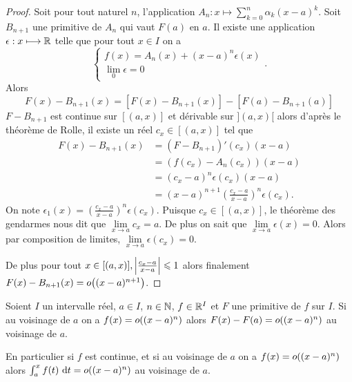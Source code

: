 \begin{proof}
  Soit pour tout naturel \(n\), l'application \(A_n : x \longmapsto \sum_{k = 0}^n
  \alpha_k(x-a)^k\). Soit \(B_{n+1}\) une primitive de \(A_n\) qui vaut \(F(a)\)
  en \(a\). Il existe une application \(\epsilon: x \longmapsto \mathbb{R}\) telle que
  pour tout \(x \in I\) on a
  \begin{equation}
    \begin{cases}
      f(x) = A_n(x)+(x-a)^n\epsilon(x) \\
      \lim\limits_{0} \epsilon = 0
    \end{cases}.
  \end{equation}
  Alors
  \begin{equation}
    F(x) - B_{n+1}(x) = [F(x)-B_{n+1}(x)] - [F(a)-B_{n+1}(a)]
  \end{equation}
  \(F-B_{n+1}\) est continue sur \([(a,x)]\) et dérivable sur \(](a,x)[\) alors
  d'après le théorème de Rolle, il existe un réel \(c_x \in [(a,x)]\) tel que
  \begin{align*}
    F(x)-B_{n+1}(x) &= (F-B_{n+1})'(c_x)(x-a)\\
    & = (f(c_x)-A_n(c_x))(x-a)\\
    & = (c_x-a)^n\epsilon(c_x)(x-a)\\
    & = (x-a)^{n+1} \left(\frac{c_x-a}{x-a}\right)^n \epsilon(c_x).
  \end{align*}
  On note \(\epsilon_1(x) = \left(\frac{c_x-a}{x-a}\right)^n \epsilon(c_x)\).
  Puisque \(c_x \in [(a,x)]\), le théorème des gendarmes nous dit que
  \(\lim\limits_{x \to a} c_x =a\). De plus on sait que \(\lim\limits_{x \to
  a}\epsilon(x) = 0\). Alors par composition de limites, \(\lim\limits_{x \to a}
  \epsilon(c_x) = 0\).

  De plus pour tout \(x \in [(a,x)], \left\lvert\frac{c_x-a}{x-a}\right\rvert \leqslant 1\) alors
  finalement \(F(x)-B_{n+1}(x) = o\mathopen{}\left((x-a)^{n+1}\right)\).
\end{proof}

\begin{corth}
  Soient \(I\) un intervalle réel, \(a \in I\), \(n \in \mathbb{N}\), \(f \in \mathbb{R}^I\) et
  \(F\) une primitive de \(f\) sur \(I\). Si au voisinage de \(a\) on a
  \(f(x) = o\mathopen{}\left((x-a)^n\right)\) alors \(F(x)-F(a) = o\mathopen{}\left((x-a)^n\right)\) au voisinage de
  \(a\).

En particulier si \(f\) est continue, et si au voisinage de \(a\) on a
\(f(x) = o\mathopen{}\left((x-a)^n\right)\) alors \(\int_a^x f(t)\,\mathop{}\mathopen{}\mathrm{d} t = o\mathopen{}\left((x-a)^n\right)\) au
voisinage de \(a\). \end{corth}

